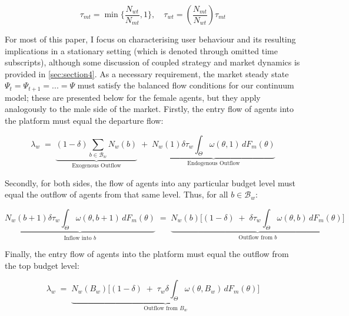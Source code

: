 
$$
\tau_{mt}=\min \Big\{\frac{N_{wt}}{N_{mt}} ,1 \Big\}, \quad \tau_{wt}= \left(\frac{N_{mt}}{N_{wt}}\right) \tau_{mt}
$$

For most of this paper, I focus on characterising user behaviour and its resulting implications in a stationary setting (which is denoted through omitted time subscripts), although some discussion of coupled strategy and market dynamics is provided in \autoref{sec:section4}. As a necessary requirement, the market steady state $\Psi_t=\Psi_{t+1}=...=\Psi$ must satisfy the balanced flow conditions for our continuum model; these are presented below for the female agents, but they apply analogously to the male side of the market. Firstly, the entry flow of agents into the platform must equal the departure flow: 

\begin{equation}\label{eq:ss1} 
    \lambda_w\;=\; \underbrace{ (1-\delta)\sum_{b\in\mathcal{B}_w}N_w(b)}_{\text{Exogenous Outflow}} \;+\; \underbrace{N_w(1) \delta \tau_w\int_{\Theta}\omega(\theta,1)\,dF_{m}(\theta)}_{\text{Endogenous Outflow}} 
\end{equation} 

Secondly, for both sides, the flow of agents into any particular budget level must equal the outflow of agents from that same level. Thus, for all $b\in\mathcal{B}_w$: 

\begin{equation}\label{eq:ss2} 
    \underbrace{N_w(b+1) \delta \tau_w \int_{\Theta} \omega(\theta,b+1)\,dF_{m}(\theta)}_{\text{Inflow into $b$}} \;=\; \underbrace{N_w(b) \Big[ (1-\delta) \;+\; \delta \tau_w\int_{\Theta} \omega(\theta,b)\,dF_{m}(\theta)\Big]}_{\text{Outflow from $b$}}
\end{equation}

Finally, the entry flow of agents into the platform must equal the outflow from the top budget level:

\begin{equation}\label{eq:ss3} 
    \lambda_w \;=\; \underbrace{N_w(B_w) \Big[ (1-\delta) \;+\; \tau_w \delta \int_{\Theta} \omega(\theta,B_w)\,dF_{m}(\theta) \Big]}_{\text{Outflow from $B_w$}}
\end{equation}

%  


